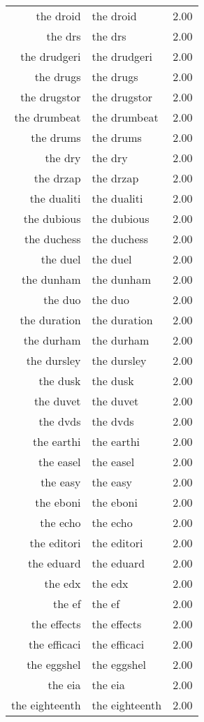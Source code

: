 \begin{table}[ht]
\begin{tabular}{rlr}
  the droid & the droid & 2.00 \\ 
  the drs & the drs & 2.00 \\ 
  the drudgeri & the drudgeri & 2.00 \\ 
  the drugs & the drugs & 2.00 \\ 
  the drugstor & the drugstor & 2.00 \\ 
  the drumbeat & the drumbeat & 2.00 \\ 
  the drums & the drums & 2.00 \\ 
  the dry & the dry & 2.00 \\ 
  the drzap & the drzap & 2.00 \\ 
  the dualiti & the dualiti & 2.00 \\ 
  the dubious & the dubious & 2.00 \\ 
  the duchess & the duchess & 2.00 \\ 
  the duel & the duel & 2.00 \\ 
  the dunham & the dunham & 2.00 \\ 
  the duo & the duo & 2.00 \\ 
  the duration & the duration & 2.00 \\ 
  the durham & the durham & 2.00 \\ 
  the dursley & the dursley & 2.00 \\ 
  the dusk & the dusk & 2.00 \\ 
  the duvet & the duvet & 2.00 \\ 
  the dvds & the dvds & 2.00 \\ 
  the earthi & the earthi & 2.00 \\ 
  the easel & the easel & 2.00 \\ 
  the easy & the easy & 2.00 \\ 
  the eboni & the eboni & 2.00 \\ 
  the echo & the echo & 2.00 \\ 
  the editori & the editori & 2.00 \\ 
  the eduard & the eduard & 2.00 \\ 
  the edx & the edx & 2.00 \\ 
  the ef & the ef & 2.00 \\ 
  the effects & the effects & 2.00 \\ 
  the efficaci & the efficaci & 2.00 \\ 
  the eggshel & the eggshel & 2.00 \\ 
  the eia & the eia & 2.00 \\ 
  the eighteenth & the eighteenth & 2.00 \\ 

\end{tabular}
\end{table}
